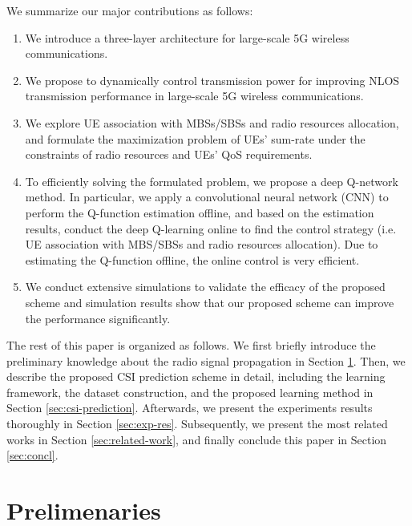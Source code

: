\documentclass[10pt,journal,cspaper,compsoc]{IEEEtran}
\begin{document}

We summarize our major contributions as follows:
\begin{enumerate}
	
	\item We introduce a three-layer architecture for large-scale 5G wireless communications.
	
	\item We propose to dynamically control transmission power for improving NLOS transmission performance in large-scale 5G wireless communications.
	
	\item We explore UE association with MBSs/SBSs and radio resources allocation, and formulate the maximization problem of UEs' sum-rate under the constraints of radio resources and UEs' QoS requirements.
	
	\item To efficiently solving the formulated problem, we propose a deep Q-network method. In particular, we apply a convolutional neural network (CNN) to perform the Q-function estimation offline, and based on the estimation results, conduct the deep Q-learning online to find the control strategy (i.e. UE association with MBS/SBSs and radio resources allocation). Due to estimating the Q-function offline, the online control is very efficient.
	
	\item We conduct extensive simulations to validate the efficacy of the proposed scheme and simulation results show that our proposed scheme can improve the performance significantly.
	
\end{enumerate}

The rest of this paper is organized as follows. We first briefly introduce the preliminary knowledge about the radio signal propagation in Section \ref{sec:prelim}. Then, we describe the proposed CSI prediction scheme in detail, including the learning framework, the dataset construction, and the proposed learning method in Section \ref{sec:csi-prediction}. Afterwards, we present the experiments results thoroughly in Section \ref{sec:exp-res}. Subsequently, we present the most related works in Section \ref{sec:related-work}, and finally conclude this paper in Section \ref{sec:concl}.

\section{Prelimenaries}\label{sec:prelim}
\end{document}
